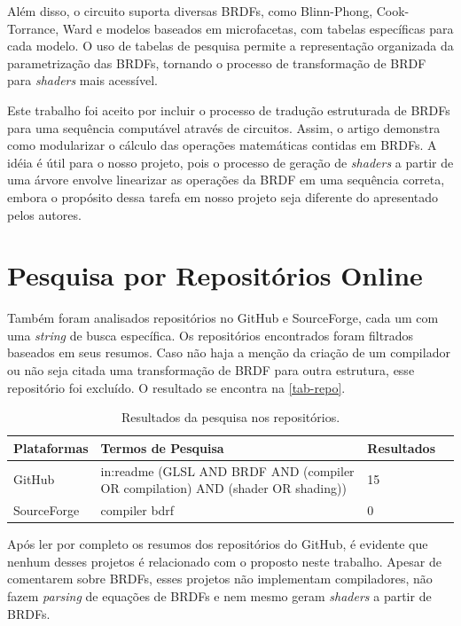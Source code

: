 Além disso, o circuito suporta diversas BRDFs, como Blinn-Phong, Cook-Torrance, Ward e modelos baseados em microfacetas, com tabelas específicas para cada modelo. O uso de tabelas de pesquisa permite a representação organizada da parametrização das BRDFs, tornando o processo de transformação de BRDF para \textit{shaders} mais acessível.

Este trabalho foi aceito por incluir o processo de tradução estruturada de BRDFs para uma sequência computável através de circuitos. Assim, o artigo demonstra como modularizar o cálculo das operações matemáticas contidas em BRDFs. A idéia é útil para o nosso projeto, pois o processo de geração de \textit{shaders} a partir de uma árvore envolve linearizar as operações da BRDF em uma sequência correta, embora o propósito dessa tarefa em nosso projeto seja diferente do apresentado pelos autores.


\section{Pesquisa por Repositórios Online}
Também foram analisados repositórios no GitHub e SourceForge, cada um com uma \textit{string} de busca específica. Os repositórios encontrados foram filtrados baseados em seus resumos. Caso não haja a menção da criação de um compilador ou não seja citada uma transformação de BRDF para outra estrutura, esse repositório foi excluído. O resultado se encontra na \autoref{tab-repo}.






\begin{table}[H]
\ABNTEXfontereduzida
\caption[bases]{\small Resultados da pesquisa nos repositórios.}
\label{tab-repo}
\begin{tabular}{p{2.6cm}|p{6.0cm}|p{2.25cm}|p{3.40cm}}
   \textbf{Plataformas} & \textbf{Termos de Pesquisa}  & \textbf{Resultados}\\
   \hline
   GitHub
   &
   in:readme (GLSL AND BRDF AND  (compiler OR compilation) AND (shader OR shading))
   & 15
   \\ \hline
   SourceForge
   &
   compiler bdrf
   & 0
\end{tabular}
\end{table}




Após ler por completo os resumos dos repositórios do GitHub, é evidente que nenhum desses projetos é relacionado com o proposto neste trabalho. Apesar de comentarem sobre BRDFs, esses projetos não implementam compiladores, não fazem \textit{parsing} de equações de BRDFs e nem mesmo geram \textit{shaders} a partir de BRDFs.

